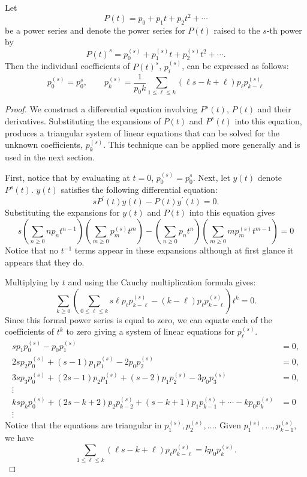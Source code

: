 \begin{proposition}[J. C. P. Miller] \label{PS:Expt:PropP}
Let 
\[
P(t) = p_0 + p_1 t + p_2 t^2 + \cdots
\]
be a power series and denote the power series for $P(t)$ raised to the
$s$-th power by
\begin{equation} \label{FPS:Expon:Eq}
P(t)^s = p^{(s)}_0 + p^{(s)}_1 t + p^{(s)}_2 t^2 + \cdots.
\end{equation}
Then the individual coefficients of $P(t)^s$,  $p^{(s)}_i$, can be
expressed as follows: 
\begin{equation}\label{Powering:Formula:Eq}
p^{(s)}_0 = p_0^s, \qquad 
p^{(s)}_k = \frac{1}{p_0 k} 
   \sum_{1 \le \ell \le k} (\ell s - k +\ell) p_\ell p^{(s)}_{k-\ell}
\end{equation}
\end{proposition}

\begin{proof}
We construct a differential equation involving $P^s(t)$, $P(t)$
and their derivatives. Substituting the expansions of $P(t)$ and
$P^s(t)$ into this equation, produces a triangular system of
linear equations that can be solved for the unknown coefficients,
$p^{(s)}_k$.  This technique can be applied more generally and is
used in the next section. 

First, notice that by evaluating at $t = 0$, $p^{(s)}_0 = p_0^s$.  Next, 
let $y(t)$ denote $P^s(t)$.  $y(t)$ satisfies the 
following differential equation:
\begin{equation}\label{Powering:ODE:Eq}
s P^{\prime}(t) y(t) - P(t) y^{\prime}(t) = 0.
\end{equation}
Substituting the expansions for $y(t)$ and $P(t)$ into this equation
gives 
\[
s \left(\sum_{n\ge 0} n p_n t^{n-1}\right)
\left(\sum_{m\ge 0} p^{(s)}_m t^{m}\right)
- 
\left(\sum_{n\ge 0} p_n t^n\right)
\left(\sum_{m\ge 0} m p^{(s)}_m t^{m-1}\right)
= 0
\]
Notice that no $t^{-1}$ terms appear in these expansions although at
first glance it appears that they do.

Multiplying by $t$ and using the Cauchy multiplication formula gives: 
\[
\sum_{k\ge0} 
\left(\sum_{0\le \ell \le k}
   s \ell p_\ell p^{(s)}_{k-\ell} - (k-\ell) p_\ell p^{(s)}_{k-\ell}\right)
 t^k = 0.
\]
Since this formal power series is equal to zero, we can equate each of
the coefficients of $t^k$ to zero giving a system of linear equations
for $p^{(s)}_{\ell}$. 
\[
\begin{aligned}
s p_1 p^{(s)}_0 - p_0 p^{(s)}_1 & = 0, \\
2s p_2 p^{(s)}_0 + (s-1) p_1 p^{(s)}_1 - 2 p_0 p^{(s)}_2  & = 0, \\
3s p_3 p^{(s)}_0 + (2s-1) p_2 p^{(s)}_1 + (s-2) p_1 p^{(s)}_2 - 3 p_0 p^{(s)}_3 & = 0, \\
\vdots \\
ks p_k p^{(s)}_0
 + (2s-k+2) p_2 p^{(s)}_{k-2} + (s-k+1) p_1 p^{(s)}_{k-1} + \cdots
 - k p_0 p^{(s)}_k &= 0\\
\vdots
\end{aligned}
\]
Notice that the equations are triangular in $p_1^{(s)}, p_2^{(s)},
\ldots$.  Given $p_1^{(s)}, \ldots, p_{k-1}^{(s)}$, we have 
\[
\sum_{1\le \ell \le k}(\ell s - k + \ell) p_\ell p^{(s)}_{k-\ell}
= k p_0 p^{(s)}_k.
\]
\end{proof}

